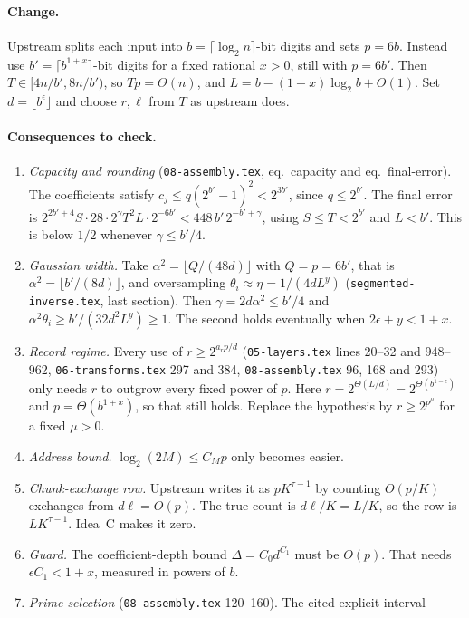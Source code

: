 \documentclass[11pt]{article}
\theoremstyle{remark}\newtheorem*{remark}{Remark}
\begin{document}
\paragraph{Change.} Upstream splits each input into $b=\lceil\log_2n\rceil$-bit digits and
sets $p=6b$. Instead use $b'=\lceil b^{1+x}\rceil$-bit digits for a fixed rational $x>0$,
still with $p=6b'$. Then $T\in[4n/b',8n/b')$, so $Tp=\Theta(n)$, and
$L=b-(1+x)\log_2b+O(1)$. Set $d=\lfloor b^\epsilon\rfloor$ and choose $r,\ell$ from $T$ as
upstream does.

\paragraph{Consequences to check.}
\begin{enumerate}
\item \emph{Capacity and rounding} (\texttt{08-assembly.tex}, eq.~capacity and
eq.~final-error). The coefficients satisfy $c_j\le q(2^{b'}-1)^2<2^{3b'}$, since $q\le2^{b'}$.
The final error is $2^{2b'+4}S\cdot28\cdot2^\gamma T^2L\cdot2^{-6b'}<448\,b'\,2^{-b'+\gamma}$,
using $S\le T<2^{b'}$ and $L<b'$. This is below $1/2$ whenever $\gamma\le b'/4$.
\item \emph{Gaussian width.} Take $\alpha^2=\lfloor Q/(48d)\rfloor$ with $Q=p=6b'$, that is $\alpha^2=\lfloor b'/(8d)\rfloor$, and oversampling $\theta_i\approx\eta=1/(4dL^y)$ (\texttt{segmented-inverse.tex}, last section). Then
$\gamma=2d\alpha^2\le b'/4$ and $\alpha^2\theta_i\ge b'/(32d^2L^y)\ge1$. The second holds eventually when $2\epsilon+y<1+x$.
\item \emph{Record regime.} Every use of $r\ge2^{a_rp/d}$ (\texttt{05-layers.tex} lines 20--32
and 948--962, \texttt{06-transforms.tex} 297 and 384, \texttt{08-assembly.tex} 96, 168 and 293)
only needs $r$ to outgrow every fixed power of $p$. Here $r=2^{\Theta(L/d)}=2^{\Theta(b^{1-\epsilon})}$
and $p=\Theta(b^{1+x})$, so that still holds. Replace the hypothesis by
$r\ge2^{p^\mu}$ for a fixed $\mu>0$.
\item \emph{Address bound.} $\log_2(2M)\le C_Mp$ only becomes easier.
\item \emph{Chunk-exchange row.} Upstream writes it as $pK^{\tau-1}$ by counting $O(p/K)$ exchanges from $d\ell=O(p)$. The true count is $d\ell/K=L/K$, so the row is $LK^{\tau-1}$. Idea~C makes it zero.
\item \emph{Guard.} The coefficient-depth bound $\Delta=C_0d^{C_1}$ must be $O(p)$. That needs
$\epsilon C_1<1+x$, measured in powers of $b$.
\item \emph{Prime selection} (\texttt{08-assembly.tex} 120--160). The cited explicit interval

\end{enumerate}
\end{document}
